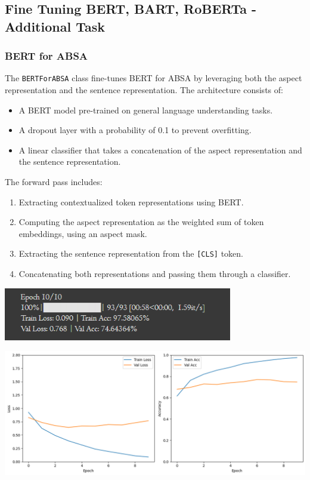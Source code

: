 \documentclass{article}
\begin{document}
\subsection{Fine Tuning BERT, BART, RoBERTa - Additional Task}

\subsubsection{BERT for ABSA}
The \texttt{BERTForABSA} class fine-tunes BERT for ABSA by leveraging both the aspect representation and the sentence representation. The architecture consists of:
\begin{itemize}
    \item A BERT model pre-trained on general language understanding tasks.
    \item A dropout layer with a probability of 0.1 to prevent overfitting.
    \item A linear classifier that takes a concatenation of the aspect representation and the sentence representation.
\end{itemize}

The forward pass includes:
\begin{enumerate}
    \item Extracting contextualized token representations using BERT.
    \item Computing the aspect representation as the weighted sum of token embeddings, using an aspect mask.
    \item Extracting the sentence representation from the \texttt{[CLS]} token.
    \item Concatenating both representations and passing them through a classifier.
\end{enumerate}

\begin{center}
\includegraphics[width=0.75\textwidth]{Bert_Accuracy.png}
\end{center}
\begin{center}
\includegraphics[width=1\textwidth]{Bert.png}
\end{center}
\end{document}
